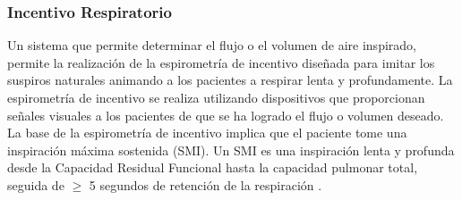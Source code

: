 \documentclass[12pt]{article}
\begin{document}
\subsubsection{Incentivo Respiratorio}
Un sistema que permite determinar el flujo o el volumen de aire inspirado, permite la realización de la espirometría de incentivo diseñada para imitar los suspiros naturales animando a los pacientes a respirar lenta y profundamente. 
La espirometría de incentivo se realiza utilizando dispositivos que proporcionan señales visuales a los pacientes de que se ha logrado el flujo o volumen deseado. La base de la espirometría de incentivo implica que el paciente tome una inspiración máxima sostenida (SMI). Un SMI es una inspiración lenta y profunda desde la Capacidad Residual Funcional hasta la capacidad pulmonar total, seguida de $\geq$ 5 segundos de retención de la respiración \cite{21}.






\end{document}
